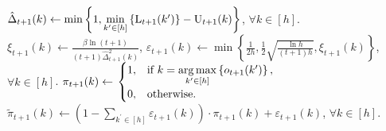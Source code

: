 \begin{algorithm}[t]
\begin{algorithmic}
		\STATE $\hat{\Delta}_{t+1}(k) \gets \min\left\{ 1,  \min\limits_{k^\prime \in \left[h\right]}\left\{ {\text{L}}_{t+1}(k^\prime) \right\}  - {\text{U}}_{t+1}(k)\right\} $, $\forall k \in [h]$.
		\STATE $\xi_{t+1}(k) \gets \frac{\beta \ln{(t+1)}}{(t+1) \hat{\Delta}_{t+1}^2(k)}$, $\varepsilon_{t+1}(k) \gets \min\left\{ \frac{1}{2 h}, \frac{1}{2} \sqrt{\frac{\ln{h}}{(t+1) h}},  \xi_{t+1}(k) \right\}$, $\forall k \in [h]$.
		\STATE $\pi_{t+1}(k) \gets \left. 
		    \begin{cases}
		    1, & \text{if } k = \operatorname*{arg\,max}\limits_{k^\prime \in \left[h\right]}\left\{ o_{t+1}(k^\prime)\right\}, \\
		    0, & \text{otherwise}.
		    \end{cases}
		    \right.$
		\STATE $\tilde{\pi}_{t+1}(k) \gets \left( 1 - \sum\limits_{k^\prime \in [h]}{\varepsilon_{t+1}(k)} \right) \cdot  \pi_{t+1}(k) + \varepsilon_{t+1}(k)$, $\forall k \in [h]$.
		
		\ENDFOR
	\end{algorithmic}
\end{algorithm}




